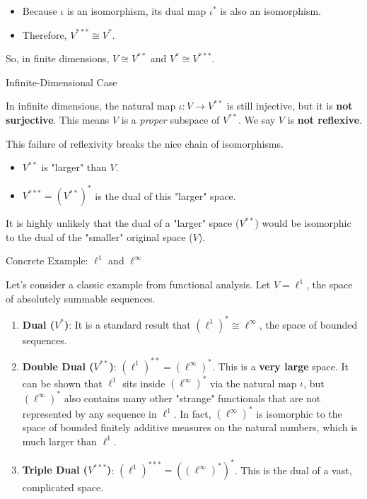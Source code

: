 \documentclass[aps,preprint]{revtex4}
\newenvironment{answer}
  {\begin{tcolorbox}[colback=green!5!white,colframe=green!75!black,title=Answer]}
  {\end{tcolorbox}}
\begin{document}
\begin{answer}
\begin{enumerate}
\begin{itemize}
\item Because $\iota$ is an isomorphism, its dual map $\iota^*$ is also an
isomorphism.

\item Therefore, $V^{***} \cong V^*$.
\end{itemize}
\end{enumerate}

So, in finite dimensions, $V \cong V^{**}$ and $V^* \cong V^{***}$.

Infinite-Dimensional Case

In infinite dimensions, the natural map $\iota: V \to V^{**}$ is still
injective, but it is \textbf{not surjective}. This means $V$ is a \textit{%
proper} subspace of $V^{**}$. We say $V$ is \textbf{not reflexive}.

This failure of reflexivity breaks the nice chain of isomorphisms.

\begin{itemize}
\item $V^{**}$ is "larger" than $V$.

\item $V^{***} = (V^{**})^*$ is the dual of this "larger" space.
\end{itemize}

It is highly unlikely that the dual of a "larger" space ($V^{**}$) would be
isomorphic to the dual of the "smaller" original space ($V$).

Concrete Example: $\ell^1$ and $\ell^\infty$

Let's consider a classic example from functional analysis. Let $V = \ell^1$,
the space of absolutely summable sequences.

\begin{enumerate}
\item \textbf{Dual ($V^*$)}: It is a standard result that $(\ell^1)^* \cong
\ell^\infty$, the space of bounded sequences.

\item \textbf{Double Dual ($V^{**}$)}: $(\ell^1)^{**} = (\ell^\infty)^*$.
This is a \textbf{very large} space. It can be shown that $\ell^1$ sits
inside $(\ell^\infty)^*$ via the natural map $\iota$, but $(\ell^\infty)^*$
also contains many other "strange" functionals that are not represented by
any sequence in $\ell^1$. In fact, $(\ell^\infty)^*$ is isomorphic to the
space of bounded finitely additive measures on the natural numbers, which is
much larger than $\ell^1$.

\item \textbf{Triple Dual ($V^{***}$)}: $(\ell^1)^{***} =
((\ell^\infty)^*)^* $. This is the dual of a vast, complicated space.
\end{enumerate}


\end{answer}
\end{document}
